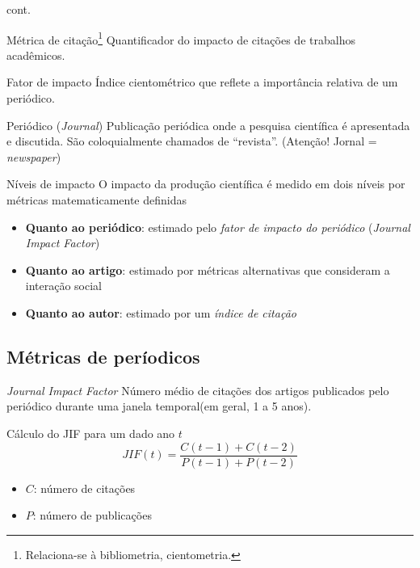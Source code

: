 \begin{frame}{cont.}
\begin{block}{Métrica de citação\footnote{Relaciona-se à bibliometria, cientometria.}}
Quantificador do impacto de citações de trabalhos acadêmicos.
\end{block}
\begin{block}{Fator de impacto}
Índice cientométrico que reflete a importância relativa de um periódico.
\end{block}
\begin{block}{Periódico (\emph{Journal})}
Publicação periódica onde a pesquisa científica é apresentada e discutida. São coloquialmente chamados de ``revista''.
(Atenção! Jornal = \emph{newspaper})
\end{block}
\end{frame}

\begin{frame}{Níveis de impacto}
O impacto da produção científica é medido em dois níveis por métricas matematicamente definidas
\begin{itemize}
\item \textbf{Quanto ao periódico}: estimado pelo \textit{fator de impacto do periódico} (\textit{Journal Impact Factor})
\item \textbf{Quanto ao artigo}: estimado por métricas alternativas que consideram a interação social
\item \textbf{Quanto ao autor}: estimado por um \textit{índice de citação}
\end{itemize}
\end{frame}

\subsection*{Métricas de períodicos}

\begin{frame}{\textit{Journal Impact Factor}}
Número médio de citações dos artigos publicados pelo periódico durante uma janela temporal(em geral, 1 a 5 anos).

\begin{block}{Cálculo do JIF para um dado ano $t$}
\[
JIF(t) = \dfrac{C(t-1) + C(t-2)}{P(t-1) + P(t-2)}
\]
\begin{itemize}
\item $C$: número de citações 
\item $P$: número de publicações
\end{itemize}
\end{block}
\end{frame}

